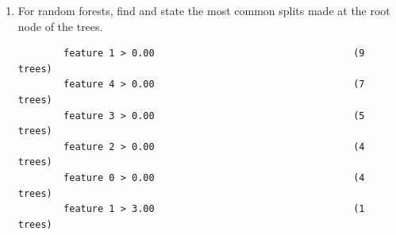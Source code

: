 \documentclass{article}
\begin{document}
\begin{enumerate}
\begin{enumerate}
        \begin{mdframed}
        $y = 0$:
        \begin{verbatim}
        feature 28 <= 0.00
        feature 29 <= 0.00
        feature 7 <= 0.00
        feature 19 <= 0.00
        feature 25 <= 1.00
        feature 13 <= 0.00
        feature 3 <= 0.00
        feature 0 <= 0.00
        feature 26 <= 0.00
        feature 31 <= 0.00
        feature 6 <= 0.00
        feature 16 <= 0.00
        feature 20 <= 0.00
        feature 30 <= 0.00
        feature 1 <= 0.00
        feature 5 <= 0.00
        feature 14 <= 0.00
        feature 21 <= 0.00
        feature 17 <= 0.00
        feature 2 <= 1.00
        feature 4 <= 0.00
        feature 18 <= 0.00
        feature 24 <= 0.00
        feature 10 <= 0.00
        feature 27 <= 1.00
        feature 15 <= 2.00
        feature 27 <= 0.00
        feature 12 <= 1.00
        feature 12 <= 0.00
        feature 8 <= 0.00
        feature 15 <= 0.00
        feature 2 <= 0.00
        feature 23 <= 0.00
        feature 25 <= 0.00
        feature 22 <= 0.00
        Classified as 0.0
        \end{verbatim}
        \end{mdframed}

        \begin{mdframed}
        $y=1$:
        \begin{verbatim}
        feature 28 <= 0.00
        feature 29 <= 0.00
        feature 7 <= 0.00
        feature 19 <= 0.00
        feature 25 <= 1.00
        feature 13 <= 0.00
        feature 3 <= 0.00
        feature 0 <= 0.00
        feature 26 <= 0.00
        feature 31 <= 0.00
        feature 6 <= 0.00
        feature 16 <= 0.00
        feature 20 <= 0.00
        feature 30 <= 0.00
        feature 1 <= 0.00
        feature 5 <= 0.00
        feature 14 <= 0.00
        feature 21 <= 0.00
        feature 17 <= 0.00
        feature 2 <= 1.00
        feature 4 <= 0.00
        feature 18 <= 0.00
        feature 24 <= 0.00
        feature 10 <= 0.00
        feature 27 <= 1.00
        feature 15 <= 2.00
        feature 27 > 0.00
        feature 2 <= 0.00
        feature 15 > 0.00
        Classified as 0.0
        \end{verbatim}
        \end{mdframed}

      \item For random forests, find and state the most common splits made at
        the root node of the trees.
        \begin{mdframed}
        \begin{verbatim}
        feature 1 > 0.00                                   (9 trees)
        feature 4 > 0.00                                   (7 trees)
        feature 3 > 0.00                                   (5 trees)
        feature 2 > 0.00                                   (4 trees)
        feature 0 > 0.00                                   (4 trees)
        feature 1 > 3.00                                   (1 trees)
        \end{verbatim}
        \end{mdframed}
    \end{enumerate}


\end{enumerate}
\end{document}
